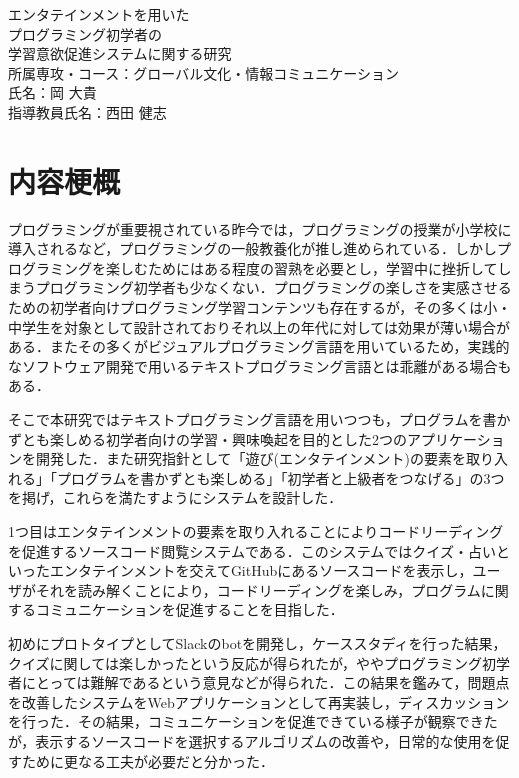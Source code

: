 \begin{center}
  {\Large エンタテインメントを用いた\\プログラミング初学者の\\学習意欲促進システムに関する研究}\\
  \vspace{20truept}
    \large{所属専攻・コース：グローバル文化・情報コミュニケーション\\}
    \large{氏名：岡 大貴\\}
    \large{指導教員氏名：西田 健志\\}
\end{center}

\section*{内容梗概}

プログラミングが重要視されている昨今では，プログラミングの授業が小学校に導入されるなど，プログラミングの一般教養化が推し進められている．しかしプログラミングを楽しむためにはある程度の習熟を必要とし，学習中に挫折してしまうプログラミング初学者も少なくない．プログラミングの楽しさを実感させるための初学者向けプログラミング学習コンテンツも存在するが，その多くは小・中学生を対象として設計されておりそれ以上の年代に対しては効果が薄い場合がある．またその多くがビジュアルプログラミング言語を用いているため，実践的なソフトウェア開発で用いるテキストプログラミング言語とは乖離がある場合もある．

そこで本研究ではテキストプログラミング言語を用いつつも，プログラムを書かずとも楽しめる初学者向けの学習・興味喚起を目的とした2つのアプリケーションを開発した．また研究指針として「遊び(エンタテインメント)の要素を取り入れる」「プログラムを書かずとも楽しめる」「初学者と上級者をつなげる」の3つを掲げ，これらを満たすようにシステムを設計した．

1つ目はエンタテインメントの要素を取り入れることによりコードリーディングを促進するソースコード閲覧システムである．このシステムではクイズ・占いといったエンタテインメントを交えてGitHubにあるソースコードを表示し，ユーザがそれを読み解くことにより，コードリーディングを楽しみ，プログラムに関するコミュニケーションを促進することを目指した．

初めにプロトタイプとしてSlackのbotを開発し，ケーススタディを行った結果，クイズに関しては楽しかったという反応が得られたが，ややプログラミング初学者にとっては難解であるという意見などが得られた．この結果を鑑みて，問題点を改善したシステムをWebアプリケーションとして再実装し，ディスカッションを行った．その結果，コミュニケーションを促進できている様子が観察できたが，表示するソースコードを選択するアルゴリズムの改善や，日常的な使用を促すために更なる工夫が必要だと分かった．

